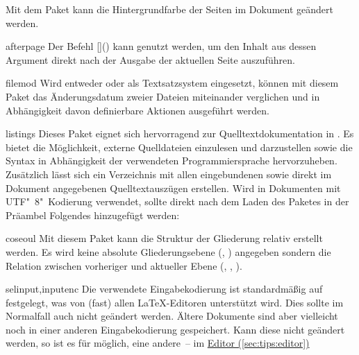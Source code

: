 \begin{packages}
  Mit dem Paket kann die Hintergrundfarbe der Seiten im Dokument geändert 
  werden.
\item[afterpage]
  Der Befehl [\PParameter{\dots}]() kann 
  genutzt werden, um den Inhalt aus dessen Argument direkt nach der Ausgabe der 
  aktuellen Seite auszuführen.
\item[filemod]
  Wird entweder  oder  als Textsatzsystem 
  eingesetzt, können mit diesem Paket das Änderungsdatum zweier Dateien 
  miteinander verglichen und in Abhängigkeit davon definierbare Aktionen 
  ausgeführt werden.
\item[listings]
  Dieses Paket eignet sich hervorragend zur Quelltextdokumentation in 
  . Es bietet die Möglichkeit, externe Quelldateien einzulesen 
  und darzustellen sowie die Syntax in Abhängigkeit der verwendeten 
  Programmiersprache hervorzuheben. Zusätzlich lässt sich ein Verzeichnis mit 
  allen eingebundenen sowie direkt im Dokument angegebenen Quelltextauszügen 
  erstellen.
  Wird  in Dokumenten mit UTF"~8"~Kodierung verwendet, 
  sollte direkt nach dem Laden des Paketes in der Präambel Folgendes 
  hinzugefügt werden:
  \begin{Code}
  \end{Code}\vspace{-\baselineskip}%
\item[coseoul]
  Mit diesem Paket kann die Struktur der Gliederung relativ erstellt werden. 
  Es wird keine absolute Gliederungsebene (, ) 
  angegeben sondern die Relation zwischen vorheriger und aktueller Ebene 
  (, , ).
\item[selinput,inputenc]
  Die verwendete Eingabekodierung ist standardmäßig auf 
  festgelegt, was von (fast) allen \LaTeX-Editoren unterstützt wird. Dies 
  sollte im Normalfall auch nicht geändert werden. Ältere Dokumente sind aber 
  vielleicht noch in einer anderen Eingabekodierung gespeichert. Kann diese 
  nicht geändert werden, so ist es für  möglich, eine 
  andere~-- im \hyperref[sec:tips:editor]{Editor (\autoref{sec:tips:editor})} 

\end{packages}
